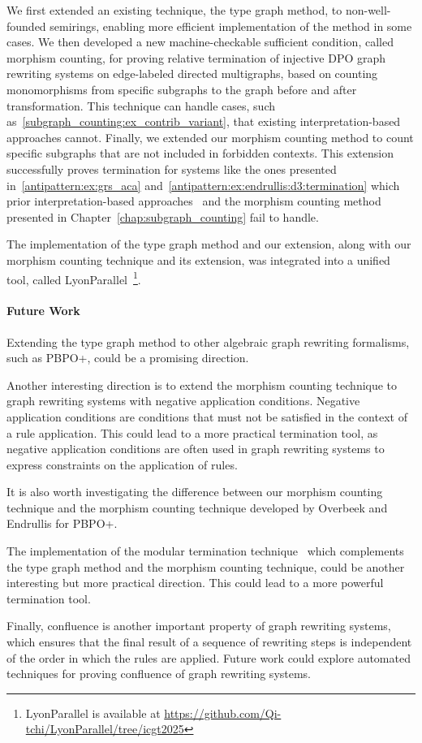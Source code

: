 \documentclass{report}
\begin{document}
We first extended an existing technique, the type graph method, to non-well-founded semirings, enabling more efficient implementation of the method in some cases.
We then developed a new machine-checkable sufficient condition, called morphism counting, for proving relative termination of injective DPO graph rewriting systems on edge-labeled directed multigraphs, based on counting monomorphisms from specific subgraphs to the graph before and after transformation. This technique can handle cases, such as~\autoref{subgraph_counting:ex_contrib_variant}, that existing interpretation-based approaches cannot.
Finally, we extended our morphism counting method to count specific subgraphs that are not included in forbidden contexts. This extension successfully proves termination for systems like the ones presented
in~\autoref{antipattern:ex:grs_aca} and~\autoref{antipattern:ex:endrullis:d3:termination} which prior interpretation-based approaches~\cite{zantema2014termination,bruggink2014termination,bruggink2015proving,endrullis2024generalized_arxiv_v2,overbeek2024termination_lmcs} and the morphism counting method presented in Chapter~\ref{chap:subgraph_counting} fail to handle.

The implementation of the type graph method and our extension, along with our morphism counting technique and its extension, was integrated into a unified tool, called LyonParallel~\footnote{LyonParallel is available at \url{https://github.com/Qi-tchi/LyonParallel/tree/icgt2025}}.
 
\paragraph{Future Work}

Extending the type graph method to other algebraic graph rewriting formalisms, such as PBPO+, could be a promising direction.

Another interesting direction is to extend the morphism counting technique to graph rewriting systems with negative application conditions. Negative application conditions are conditions that must not be satisfied in the context of a rule application. This could lead to a more practical termination tool, as negative application conditions are often used in graph rewriting systems to express constraints on the application of rules.

It is also worth investigating the difference between our morphism counting technique and
 the morphism counting technique developed by Overbeek and Endrullis for PBPO+. 
 
The implementation of the modular termination technique~\cite{plump2018modular} which complements the type graph method and the morphism counting technique, could be another interesting but more practical direction. This could lead to a more powerful termination tool.
  
Finally, confluence is another important property of graph rewriting systems, which ensures that the final result of a sequence of rewriting steps is independent of the order in which the rules are applied. Future work could explore automated techniques for proving confluence of graph rewriting systems.

\printbibliography
\end{document}
